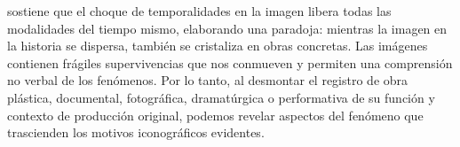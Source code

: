 \parencite{DidiHuberman2011} sostiene que el choque de temporalidades en la imagen libera todas las modalidades del tiempo mismo, elaborando una paradoja: mientras la imagen en la historia se dispersa, también se cristaliza en obras concretas. Las imágenes contienen frágiles supervivencias que nos conmueven y permiten una comprensión no verbal de los fenómenos. Por lo tanto, al desmontar el registro de obra plástica, documental, fotográfica, dramatúrgica o performativa de su función y contexto de producción original, podemos revelar aspectos del fenómeno que trascienden los motivos iconográficos evidentes.

